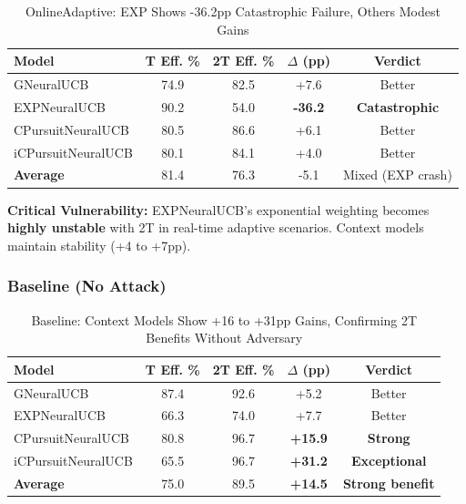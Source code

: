 \documentclass[11pt,a4paper]{article}
\newcommand{\critical}[1]{\textcolor{criticalcolor}{\textbf{#1}}}
\newcommand{\success}[1]{\textcolor{successcolor}{\textbf{#1}}}
\begin{document}
\vspace{-0.4cm}
\begin{table}[H]
\scriptsize
\centering
\begin{tabular}{lcccc}
\toprule
\textbf{Model} & \textbf{T Eff. \%} & \textbf{2T Eff. \%} & \textbf{$\Delta$ (pp)} & \textbf{Verdict} \\
\midrule
GNeuralUCB & 74.9 & 82.5 & +7.6 & Better \\
EXPNeuralUCB & 90.2 & 54.0 & \critical{-36.2} & \critical{Catastrophic} \\
CPursuitNeuralUCB & 80.5 & 86.6 & +6.1 & Better \\
iCPursuitNeuralUCB & 80.1 & 84.1 & +4.0 & Better \\
\midrule
\textbf{Average} & 81.4 & 76.3 & -5.1 & Mixed (EXP crash) \\
\bottomrule
\end{tabular}
\vspace{-0.2cm}
\caption{OnlineAdaptive: EXP Shows -36.2pp Catastrophic Failure, Others Modest Gains}
\end{table}

\vspace{-0.2cm}
\textbf{Critical Vulnerability:} EXPNeuralUCB's exponential weighting becomes \critical{highly unstable} with 2T in real-time adaptive scenarios. Context models maintain stability (+4 to +7pp).

\subsubsection{Baseline (No Attack)}

\vspace{-0.4cm}
\begin{table}[H]
\scriptsize
\centering
\begin{tabular}{lcccc}
\toprule
\textbf{Model} & \textbf{T Eff. \%} & \textbf{2T Eff. \%} & \textbf{$\Delta$ (pp)} & \textbf{Verdict} \\
\midrule
GNeuralUCB & 87.4 & 92.6 & +5.2 & Better \\
EXPNeuralUCB & 66.3 & 74.0 & +7.7 & Better \\
CPursuitNeuralUCB & 80.8 & 96.7 & \success{+15.9} & \success{Strong} \\
iCPursuitNeuralUCB & 65.5 & 96.7 & \success{+31.2} & \success{Exceptional} \\
\midrule
\textbf{Average} & 75.0 & 89.5 & \success{+14.5} & \success{Strong benefit} \\
\bottomrule
\end{tabular}
\vspace{-0.2cm}
\caption{Baseline: Context Models Show +16 to +31pp Gains, Confirming 2T Benefits Without Adversary}
\end{table}
\end{document}
